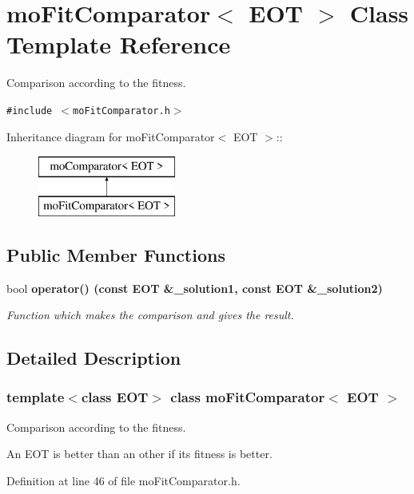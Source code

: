\section{mo\-Fit\-Comparator$<$ EOT $>$ Class Template Reference}
\label{classmo_fit_comparator}
Comparison according to the fitness.  


{\tt \#include $<$mo\-Fit\-Comparator.h$>$}

Inheritance diagram for mo\-Fit\-Comparator$<$ EOT $>$::\begin{figure}[H]
\begin{center}
\leavevmode
\includegraphics[height=2cm]{classmo_fit_comparator}
\end{center}
\end{figure}
\subsection*{Public Member Functions}
\begin{CompactItemize}
\item 
bool \bf{operator()} (const EOT \&\_\-solution1, const EOT \&\_\-solution2)
\begin{CompactList}\small\item\em Function which makes the comparison and gives the result. \item\end{CompactList}\end{CompactItemize}


\subsection{Detailed Description}
\subsubsection*{template$<$class EOT$>$ class mo\-Fit\-Comparator$<$ EOT $>$}

Comparison according to the fitness. 

An EOT is better than an other if its fitness is better. 



Definition at line 46 of file mo\-Fit\-Comparator.h.

